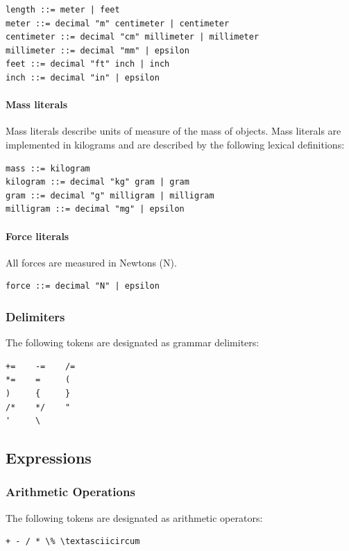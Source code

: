 \begin{verbatim}
length ::= meter | feet
meter ::= decimal "m" centimeter | centimeter
centimeter ::= decimal "cm" millimeter | millimeter
millimeter ::= decimal "mm" | epsilon
feet ::= decimal "ft" inch | inch
inch ::= decimal "in" | epsilon
\end{verbatim}

\paragraph{Mass literals}

Mass literals describe units of measure of the mass of objects. Mass
literals are implemented in kilograms and are described by the
following lexical definitions:

\begin{verbatim}
mass ::= kilogram
kilogram ::= decimal "kg" gram | gram
gram ::= decimal "g" milligram | milligram
milligram ::= decimal "mg" | epsilon
\end{verbatim}

\paragraph{Force literals}

All forces are measured in Newtons (N).

\begin{verbatim}
force ::= decimal "N" | epsilon
\end{verbatim}

\subsubsection{Delimiters}
The following tokens are designated as grammar delimiters:

\begin{verbatim}
+=    -=    /=        	
*=    =     (
)     {     }
/*    */    "
'     \
\end{verbatim}

\subsection{Expressions}

\subsubsection{Arithmetic Operations}
The following tokens are designated as arithmetic operators:
\begin{verbatim}
+ - / * \% \textasciicircum
\end{verbatim}

